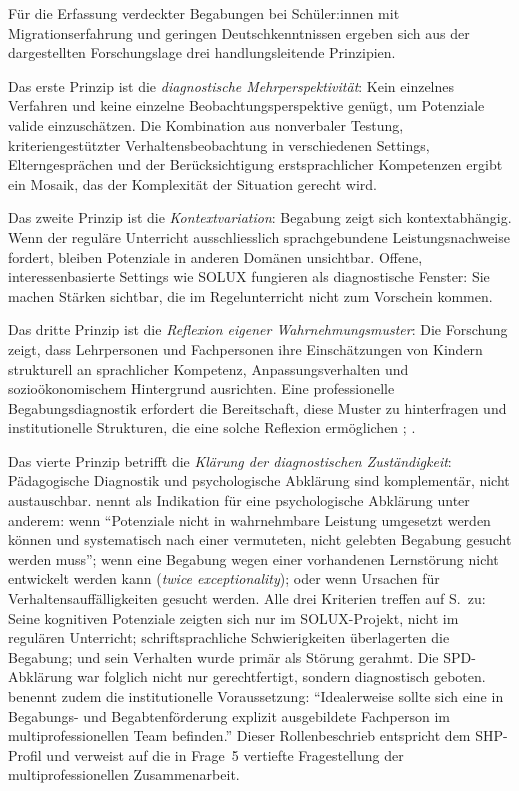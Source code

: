 \documentclass[ngerman, a4paper]{article}
\begin{document}
Für die Erfassung verdeckter Begabungen bei Schüler:innen mit Migrationserfahrung und
geringen Deutschkenntnissen ergeben sich aus der dargestellten Forschungslage drei
handlungsleitende Prinzipien.

Das erste Prinzip ist die \textit{diagnostische Mehrperspektivität}: Kein einzelnes
Verfahren und keine einzelne Beobachtungsperspektive genügt, um Potenziale valide
einzuschätzen. Die Kombination aus nonverbaler Testung, kriteriengestützter
Verhaltensbeobachtung in verschiedenen Settings, Elterngesprächen und der
Berücksichtigung erstsprachlicher Kompetenzen ergibt ein Mosaik, das der Komplexität
der Situation gerecht wird.

Das zweite Prinzip ist die \textit{Kontextvariation}: Begabung zeigt sich
kontextabhängig. Wenn der reguläre Unterricht ausschliesslich sprachgebundene
Leistungsnachweise fordert, bleiben Potenziale in anderen Domänen unsichtbar.
Offene, interessenbasierte Settings wie SOLUX fungieren als diagnostische Fenster: Sie
machen Stärken sichtbar, die im Regelunterricht nicht zum Vorschein kommen.

Das dritte Prinzip ist die \textit{Reflexion eigener Wahrnehmungsmuster}: Die
Forschung zeigt, dass Lehrpersonen und Fachpersonen ihre Einschätzungen von Kindern
strukturell an sprachlicher Kompetenz, Anpassungsverhalten und sozioökonomischem
Hintergrund ausrichten. Eine professionelle Begabungsdiagnostik erfordert die
Bereitschaft, diese Muster zu hinterfragen und institutionelle Strukturen, die eine
solche Reflexion ermöglichen
\parencite[S.\,576--585]{stamm2021fehlenderblick};
\parencite[S.\,115--128]{baudson2021wasdenken}.

Das vierte Prinzip betrifft die \textit{Klärung der diagnostischen
  Zuständigkeit}: Pädagogische Diagnostik und psychologische Abklärung
sind komplementär, nicht austauschbar.
\textcite[S.\,235]{muelleroppliger2021paeddiagnostik} nennt als
Indikation für eine psychologische Abklärung unter anderem: wenn
\enquote{Potenziale nicht in wahrnehmbare Leistung umgesetzt werden
  können und systematisch nach einer vermuteten, nicht gelebten Begabung
  gesucht werden muss}; wenn eine Begabung wegen einer vorhandenen
Lernstörung nicht entwickelt werden kann (\textit{twice exceptionality});
oder wenn Ursachen für Verhaltensauffälligkeiten gesucht werden. Alle
drei Kriterien treffen auf S.\ zu: Seine kognitiven Potenziale zeigten
sich nur im SOLUX-Projekt, nicht im regulären Unterricht;
schriftsprachliche Schwierigkeiten überlagerten die Begabung; und sein
Verhalten wurde primär als Störung gerahmt. Die SPD-Abklärung war
folglich nicht nur gerechtfertigt, sondern diagnostisch geboten.
\textcite[S.\,228]{muelleroppliger2021paeddiagnostik} benennt zudem die
institutionelle Voraussetzung: \enquote{Idealerweise sollte sich eine in
  Begabungs- und Begabtenförderung explizit ausgebildete Fachperson im
  multiprofessionellen Team befinden.} Dieser Rollenbeschrieb entspricht
dem SHP-Profil und verweist auf die in Frage~5 vertiefte Fragestellung
der multiprofessionellen Zusammenarbeit.
\end{document}
